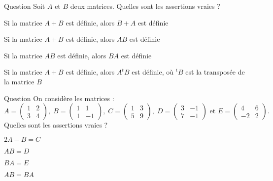 

\begin{multi}[multiple,feedback=
{La somme de deux matrices est définie si les deux matrices admettent la même taille. Dans ce cas, on a \(A+B=B+A\). Le produit \(AB\) de deux matrices est défini si le nombre de colonnes de \(A\) est égal au nombre de lignes de \(B\). Le produit n'est pas commutatif.
}]{Question}
Soit \(A\) et \(B\) deux matrices. Quelles sont les assertions vraies ?

    \item* Si la matrice \(A+B\) est définie, alors \(B+A\) est définie
    \item Si la matrice \(A+B\) est définie, alors \(AB\) est définie
    \item Si la matrice \(AB\) est définie, alors \(BA\) est définie
    \item* Si la matrice \(A+B\) est définie, alors \(A^tB\) est définie, où \(^tB\) est la transposée de la matrice \(B\)
\end{multi}


\begin{multi}[multiple,feedback=
{On a : \(2A-B=C\), \(AB=D\) et \(BA =  \left(\begin{array}{rc}4&6\\-2&-2 \end{array}\right)\).
}]{Question}
On considère les matrices : 
\[A=  
\left(\begin{array}{rc}
1&2\\
3&4\end{array}\right),\; B=  
\left(\begin{array}{rc}
1&1\\
1&-1\end{array}\right),\; C=  
\left(\begin{array}{rc}
1&3\\
5&9\end{array}\right),\; D=  
\left(\begin{array}{rc}
3&-1\\
7&-1\end{array}\right)\mbox{ et }E=  
\left(\begin{array}{rc}
4&6\\
-2&2\end{array}\right).\] 
Quelles sont les assertions vraies ?

    \item* \(2A-B=C\)
    \item* \(AB=D\)
    \item \(BA=E\)
    \item \(AB=BA\)
\end{multi}


